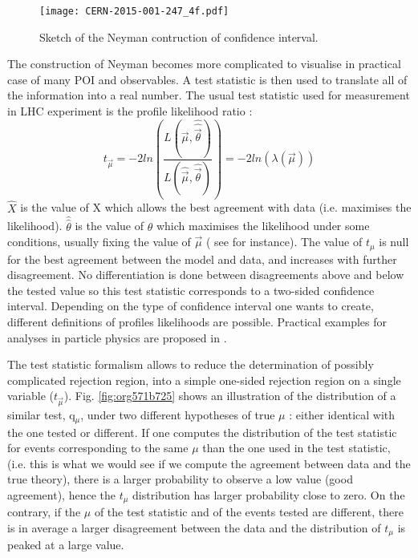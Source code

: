 \begin{figure}[htbp]
\centering
\texttt{[image: CERN-2015-001-247\_4f.pdf]}
\caption{\label{fig:org410e477}
Sketch of the Neyman contruction of confidence interval. \cite{CERN-2015-001-247}}
\end{figure}

The construction of Neyman becomes more complicated to visualise in practical case of many POI and observables.
A test statistic is then used to translate all of the information into a real number.
The usual test statistic used for measurement in LHC experiment is the profile likelihood ratio :
\begin{equation}
\label{eq:org444fadf}
t_{\vec{\mu}} = -2ln \left(\frac{L(\vec{\mu},\hat{\hat{\vec{\theta}}})}{L(\hat{\vec{\mu}},\hat{\vec{\theta}})} \right) = -2ln(\lambda(\vec{\mu}))
\end{equation}
\(\hat{X}\) is the value of X which allows the best agreement with data (i.e. maximises the likelihood).
\(\hat{\hat{\theta}}\) is the value of $\theta$ which maximises the likelihood under some conditions, usually fixing the value of \(\vec{\mu}\) ( see \cite{Cowan:1071727} for instance).
The value of $t_\mu$ is null for the best agreement between the model and data, and increases with further disagreement.
No differentiation is done between disagreements above and below the tested value so this test statistic corresponds to a two-sided confidence interval.
Depending on the type of confidence interval one wants to create, different definitions of profiles likelihoods are possible.
Practical examples for analyses in particle physics are proposed in \cite{Cowan:1071727}.


The test statistic formalism allows to reduce the determination of possibly complicated rejection region, into a simple one-sided rejection region on a single variable (\(t_{\vec{\mu}}\)).
Fig. \ref{fig:org571b725} shows an illustration of the distribution of a similar test, q\(_{\mu}\), under two different hypotheses of true \(\mu\) : either identical with the one tested or different.
If one computes the distribution of the test statistic for events corresponding to the same \(\mu\) than the one used in the test statistic, (i.e. this is what we would see if we compute the agreement between data and the true theory), there is a larger probability to observe a low value (good agreement), hence the $t_\mu$ distribution has larger probability close to zero.
On the contrary, if the \(\mu\) of the test statistic and of the events tested are different, there is in average a larger disagreement between the data and the distribution of $t_\mu$ is peaked at a large value.


